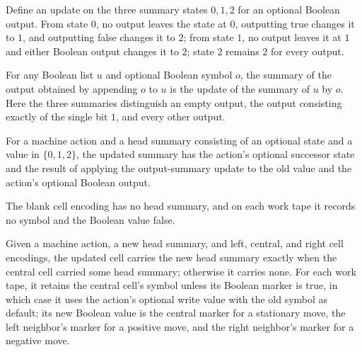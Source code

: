 \begin{definition}
\label{Complexity.Codec.sumUpd}
\leanok
Define an update on the three summary states $0,1,2$ for an optional Boolean output.
From state $0$, no output leaves the state at $0$, outputting true changes it to $1$,
and outputting false changes it to $2$; from state $1$, no output leaves it at $1$ and
either Boolean output changes it to $2$; state $2$ remains $2$ for every output.
\end{definition}

\begin{lemma}
\label{Complexity.Codec.sumIdx_append}
\leanok
{}
For any Boolean list $u$ and optional Boolean symbol $o$, the summary of the output
obtained by appending $o$ to $u$ is the update of the summary of $u$ by $o$. Here the
three summaries distinguish an empty output, the output consisting exactly of the single
bit $1$, and every other output.
\end{lemma}

\begin{definition}
\label{Complexity.Codec.newHd}
\leanok
{}
For a machine action and a head summary consisting of an optional state and a value in
$\{0,1,2\}$, the updated summary has the action's optional successor state and the result
of applying the output-summary update to the old value and the action's optional Boolean
output.
\end{definition}

\begin{definition}
\label{Complexity.Codec.cellE}
\leanok
{}
The blank cell encoding has no head summary, and on each work tape it records no symbol
and the Boolean value false.
\end{definition}

\begin{definition}
\label{Complexity.Codec.stepCell}
\leanok
{}
Given a machine action, a new head summary, and left, central, and right cell encodings,
the updated cell carries the new head summary exactly when the central cell carried some
head summary; otherwise it carries none. For each work tape, it retains the central
cell's symbol unless its Boolean marker is true, in which case it uses the action's
optional write value with the old symbol as default; its new Boolean value is the
central marker for a stationary move, the left neighbor's marker for a positive move,
and the right neighbor's marker for a negative move.
\end{definition}

